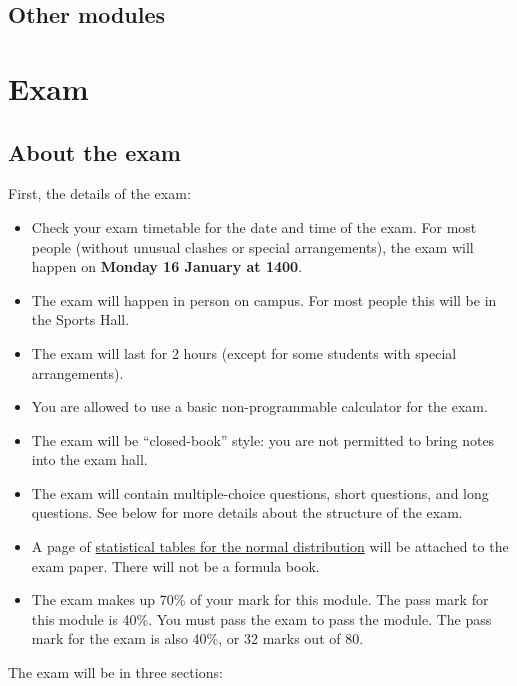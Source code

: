 \documentclass[
  letterpaper,
  DIV=11,
  numbers=noendperiod]{scrreprt}
\providecommand{\tightlist}{%
  \setlength{\itemsep}{0pt}\setlength{\parskip}{0pt}}\usepackage{longtable,booktabs,array}
\theoremstyle{remark}
\begin{document}
\hypertarget{other-modules}{%
\section{Other modules}\label{other-modules}}

\hypertarget{L22-exam}{%
\chapter{Exam}\label{L22-exam}}

\hypertarget{about-the-exam}{%
\section{About the exam}\label{about-the-exam}}

First, the details of the exam:

\begin{itemize}
\tightlist
\item
  Check your exam timetable for the date and time of the exam. For most
  people (without unusual clashes or special arrangements), the exam
  will happen on \textbf{Monday 16 January at 1400}.
\item
  The exam will happen in person on campus. For most people this will be
  in the Sports Hall.
\item
  The exam will last for 2 hours (except for some students with special
  arrangements).
\item
  You are allowed to use a basic non-programmable calculator for the
  exam.
\item
  The exam will be ``closed-book'' style: you are not permitted to bring
  notes into the exam hall.
\item
  The exam will contain multiple-choice questions, short questions, and
  long questions. See below for more details about the structure of the
  exam.
\item
  A page of
  \href{https://mpaldridge.github.io/math1710/stat-tab.pdf}{statistical
  tables for the normal distribution} will be attached to the exam
  paper. There will not be a formula book.
\item
  The exam makes up 70\% of your mark for this module. The pass mark for
  this module is 40\%. You must pass the exam to pass the module. The
  pass mark for the exam is also 40\%, or 32 marks out of 80.
\end{itemize}

The exam will be in three sections:
\end{document}
